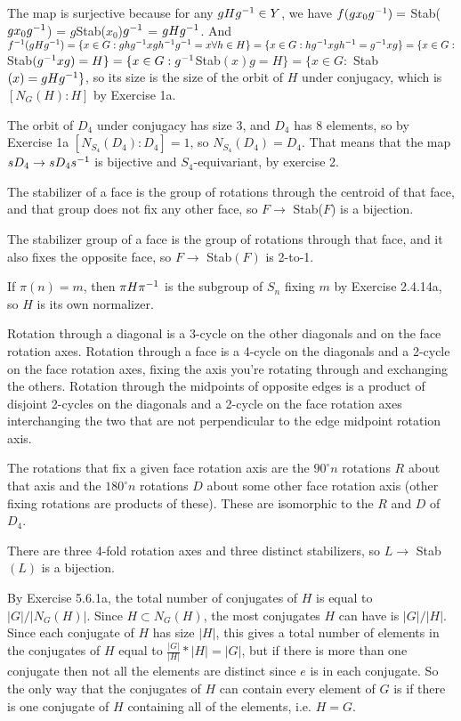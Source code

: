 \documentclass[11pt, oneside]{article}   	%
\begin{document}
The map is surjective because for any $gHg^{-1}\in Y$, we have $f(gx_0g^{-1}) = $ Stab($gx_0g^{-1}$) = $g$Stab($x_0$)$g^{-1}$ = $gHg^{-1}$. And $f^{-1}(gHg^{-1}) = \{x \in G: ghg^{-1} xgh^{-1} g^{-1} = x \forall h \in H\} = \{x\in G: hg^{-1} x gh^{-1} = g^{-1} xg\} = \{x \in G: $ Stab$(g^{-1} xg) = H\} = \{x \in G: g^{-1}$Stab$(x)g = H\} = \{x \in G: $ Stab$(x) = gHg^{-1}\}$, so its size is the size of the orbit of $H$ under conjugacy, which is $[N_G(H):H]$ by Exercise 1a. 
\item The orbit of $D_4$ under conjugacy has size 3, and $D_4$ has 8 elements, so by Exercise 1a $[N_{S_4}(D_4) : D_4] = 1$, so $N_{S_4}(D_4) = D_4$. That means that the map $sD_4 \to sD_4s^{-1}$ is bijective and $S_4$-equivariant, by exercise 2.
\item The stabilizer of a face is the group of rotations through the centroid of that face, and that group does not fix any other face, so $F \to$ Stab($F$) is a bijection.
\item The stabilizer group of a face is the group of rotations through that face, and it also fixes the opposite face, so $F \to $ Stab$(F)$ is 2-to-1.
\item If $\pi(n) = m$, then $\pi H \pi^{-1}$ is the subgroup of $S_n$ fixing $m$ by Exercise 2.4.14a, so $H$ is its own normalizer.
\item \be
\item Rotation through a diagonal is a 3-cycle on the other diagonals and on the face rotation axes. Rotation through a face is a 4-cycle on the diagonals and a 2-cycle on the face rotation axes, fixing the axis you're rotating through and exchanging the others. Rotation through the midpoints of opposite edges is a product of disjoint 2-cycles on the diagonals and a 2-cycle on the face rotation axes interchanging the two that are not perpendicular to the edge midpoint rotation axis.
\item The rotations that fix a given face rotation axis are the $90^\circ n$ rotations $R$ about that axis and the $180^\circ n$ rotations $D$ about some other face rotation axis (other fixing rotations are products of these). These are isomorphic to the $R$ and $D$ of $D_4$.
\item There are three 4-fold rotation axes and three distinct stabilizers, so $L\to$ Stab$(L)$ is a bijection.
\ee
\item By Exercise 5.6.1a, the total number of conjugates of $H$ is equal to $|G|/|N_G(H)|$. Since $H \subset N_G(H)$, the most conjugates $H$ can have is $|G|/|H|$. Since each conjugate of $H$ has size $|H|$, this gives a total number of elements in the conjugates of $H$ equal to $\frac{|G|}{|H|} * |H| = |G|$, but if there is more than one conjugate then not all the elements are distinct since $e$ is in each conjugate. So the only way that the conjugates of $H$ can contain every element of $G$ is if there is one conjugate of $H$ containing all of the elements, i.e. $H = G$.
\end{document}
